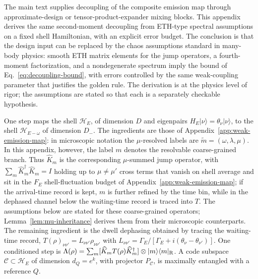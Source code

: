 \documentclass[12pt]{article}
\newcommand{\ket}[1]{|#1\rangle}
\newcommand{\bra}[1]{\langle #1|}
\begin{document}
The main text supplies decoupling of the composite emission map through
approximate-design or tensor-product-expander mixing blocks.  This appendix
derives the same second-moment decoupling from ETH-type spectral assumptions
on a fixed shell Hamiltonian, with an explicit error budget.  The conclusion
is that the design input can be replaced by the chaos assumptions standard in
many-body physics: smooth ETH matrix elements for the jump operators, a
fourth-moment factorization, and a nondegenerate spectrum imply the bound of
Eq.~\eqref{eq:decoupling-bound}, with errors controlled by the same
weak-coupling parameter that justifies the golden rule.  The derivation is at
the physics level of rigor; the assumptions are stated so that each is a
separately checkable hypothesis.

One step maps the shell $\mathcal H_E$, of dimension $D$ and eigenpairs
$H_E\ket\nu=\theta_\nu\ket\nu$, to the shell $\mathcal H_{E-\omega}$ of
dimension $D_-$.  The ingredients are those of
Appendix~\ref{app:weak-emission-map}: in microscopic notation the
$\mu$-resolved labels are
$\tilde m=(\omega,\lambda,\mu)$.  In this appendix, however, the label
$m$ denotes the resolvable coarse-grained branch.  Thus $\widehat K_m$ is
the corresponding $\mu$-summed jump operator, with
$\sum_m\widehat K_m^\dagger\widehat K_m=I$ holding up to $\mu\neq\mu'$
cross terms that vanish on shell average and sit in the $F_E$
shell-fluctuation budget of Appendix~\ref{app:weak-emission-map}; if the
arrival-time record is
kept, $m$ is further refined by the time bin, while in the dephased channel
below the waiting-time record is traced into $T$.  The assumptions below
are stated for these coarse-grained operators;
Lemma~\ref{lem:mu-inheritance} derives them from their microscopic
counterparts.  The remaining ingredient is the dwell
dephasing obtained by tracing the waiting-time record,
$T(\rho)_{\nu\nu'}=L_{\nu\nu'}\rho_{\nu\nu'}$ with
$L_{\nu\nu'}=\Gamma_E/[\Gamma_E+i(\theta_\nu-\theta_{\nu'})]$.  One
conditioned step is
$\Lambda(\rho)=\sum_m[\widehat K_m T(\rho)\widehat K_m^\dagger]
\otimes\ket m\bra m_{\rm R}$.
A code subspace $\mathcal C\subset\mathcal H_E$ of dimension $d_Q=e^k$, with
projector $P_{\mathcal C}$, is maximally entangled with a reference $Q$.
\end{document}
